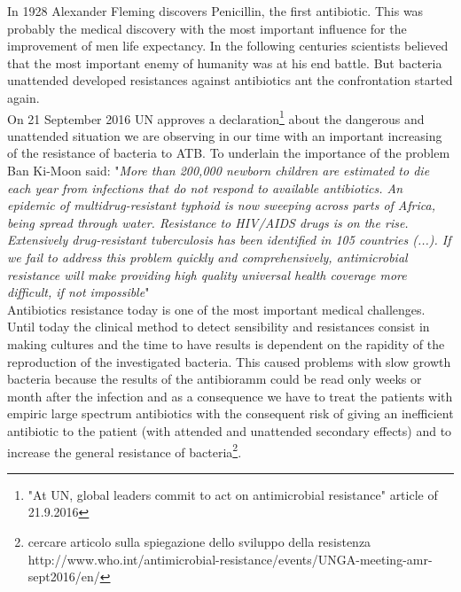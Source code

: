 \documentclass[11pt, a4paper]{article}
\begin{document}
In 1928 Alexander Fleming discovers Penicillin, the first antibiotic. This was probably the medical discovery with the most important influence for the improvement of men life expectancy.
In the following centuries scientists believed that the most important enemy of humanity was at his end battle. 
But bacteria unattended developed resistances against antibiotics ant the confrontation started again. 
\\
On 21 September 2016 UN approves a declaration\footnote{"At UN, global leaders commit to act on antimicrobial resistance" article of 21.9.2016} about the dangerous and unattended situation we are observing in our time with an important increasing of the resistance of bacteria to ATB. To underlain the importance of the problem Ban Ki-Moon said: 
"\textit{More than 200,000 newborn children are estimated to die each year from infections that do not respond to available antibiotics. An epidemic of multidrug-resistant typhoid is now sweeping across parts of Africa, being spread through water. Resistance to HIV/AIDS drugs is on the rise. Extensively drug-resistant tuberculosis has been identified in 105 countries (...). If we fail to address this problem quickly and comprehensively, antimicrobial resistance will make providing high quality universal health coverage more difficult, if not impossible}"\cite{Ban16}
\\
Antibiotics resistance today is one of the most important medical challenges. Until today the clinical method to detect sensibility and resistances consist in making cultures and the time to have results is dependent on the rapidity of the reproduction of the investigated bacteria. This caused problems with slow growth bacteria because the results of the antibioramm could be read only weeks or month after the infection and as a consequence we have to treat the patients with empiric large spectrum antibiotics with the consequent risk of giving an inefficient antibiotic to the patient (with attended and unattended secondary effects) and to increase the general resistance of bacteria\footnote{cercare articolo sulla spiegazione dello sviluppo della resistenza
http://www.who.int/antimicrobial-resistance/events/UNGA-meeting-amr-sept2016/en/}.
\end{document}
